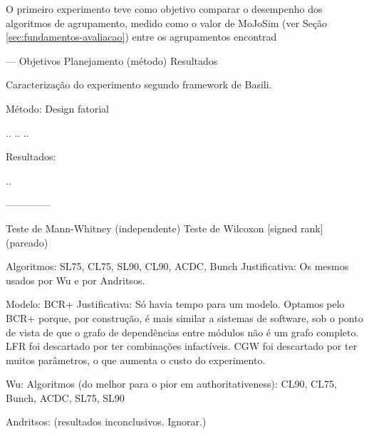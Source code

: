 \begin{section}

O primeiro experimento teve como objetivo comparar o desempenho dos algoritmos de agrupamento, medido como o valor de MoJoSim (ver Seção \ref{sec:fundamentos-avaliacao}) entre os agrupamentos encontrad
	
\end{section}


---
Objetivos
Planejamento (método)
Resultados






Caracterização do experimento segundo framework de Basili.

Método:
Design fatorial

..
..
..

Resultados:

..
 
--------------

Teste de Mann-Whitney (independente)
Teste de Wilcoxon [signed rank] (pareado)

Algoritmos:
SL75, CL75, SL90, CL90, ACDC, Bunch
Justificativa: Os mesmos usados por Wu e por Andritsos.

Modelo: BCR+
Justificativa: Só havia tempo para um modelo.
Optamos pelo BCR+ porque, por construção, é mais similar a sistemas de software, sob o ponto de vista de que o grafo de dependências entre módulos não é um grafo completo.
LFR foi descartado por ter combinações infactíveis.
CGW foi descartado por ter muitos parâmetros, o que aumenta o custo do experimento.


Wu:
Algoritmos (do melhor para o pior em authoritativeness):
CL90, CL75, Bunch, ACDC, SL75, SL90

Andritsos: (resultados inconclusivos. Ignorar.)